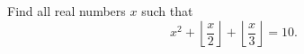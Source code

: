 Find all real numbers $x$ such that
\[x^2+\left\lfloor\dfrac {x}{2}\right\rfloor+\left\lfloor\dfrac {x}{3}\right\rfloor=10 .\]
